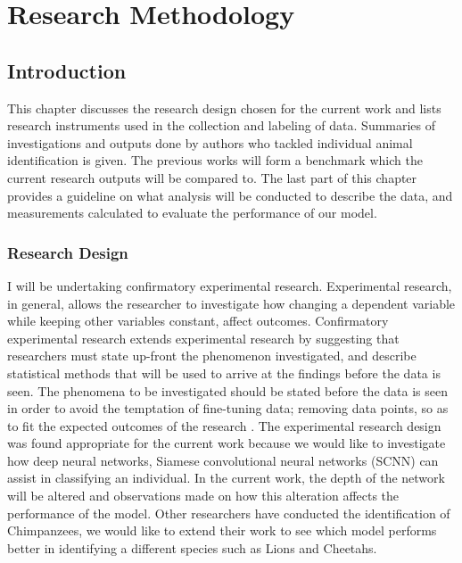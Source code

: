%
%
%

\chapter{Research Methodology}
\section{Introduction}
This chapter discusses the research design chosen for the current work and lists research instruments used in the collection and labeling of data. Summaries of investigations and outputs done by authors who tackled individual animal identification is given. The previous works will form a benchmark which the current research outputs will be compared to. The last part of this chapter provides a guideline on what analysis will be conducted to describe the data, and measurements calculated to evaluate the performance of our model.
\subsection{Research Design}
I will be undertaking confirmatory experimental research. Experimental research, in general, allows the researcher to investigate how changing a dependent variable while keeping other variables constant, affect outcomes. Confirmatory experimental research extends experimental research by suggesting that researchers must state up-front the phenomenon investigated, and describe statistical methods that will be used to arrive at the findings before the data is seen. The phenomena to be investigated should be stated before the data is seen in order to avoid the temptation of fine-tuning data; removing data points, so as to fit the expected outcomes of the research \cite{wagenmakers2012agenda}. The experimental research design was found appropriate for the current work because we would like to investigate how deep neural networks, Siamese convolutional neural networks (SCNN) can assist in classifying an individual. In the current work, the depth of the network will be altered and observations made on how this alteration affects the performance of the model. Other researchers have conducted the identification of Chimpanzees, we would like to extend their work to see which model performs better in identifying a different species such as Lions and Cheetahs.   
